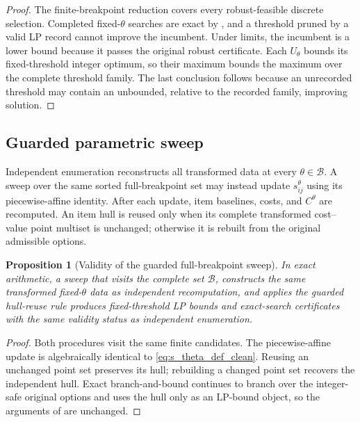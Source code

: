 \documentclass[11pt, a4paper]{article}
\theoremstyle{plain}
\newtheorem{proposition}[proposition]{Proposition}
\theoremstyle{definition}
\theoremstyle{remark}
\begin{document}
\begin{proof}
The finite-breakpoint reduction covers every robust-feasible discrete
selection.  Completed fixed-$\theta$ searches are exact by
, and a threshold pruned by a valid LP record cannot
improve the incumbent.  Under limits, the incumbent is a lower bound because
it passes the original robust certificate.  Each $U_\theta$ bounds its
fixed-threshold integer optimum, so their maximum bounds the maximum over the
complete threshold family.  The last conclusion follows because an unrecorded
threshold may contain an unbounded, relative to the recorded family, improving
solution.
\end{proof}

\subsection{Guarded parametric sweep}\label{subsec:sweep}

Independent enumeration reconstructs all transformed data at every
$\theta\in\mathcal B$.  A sweep over the same sorted full-breakpoint set may
instead update $s^\theta_{ij}$ using its piecewise-affine identity.  After each
update, item baselines, costs, and $C^\theta$ are recomputed.  An item hull is
reused only when its complete transformed cost--value point multiset is
unchanged; otherwise it is rebuilt from the original admissible options.

\begin{proposition}[Validity of the guarded full-breakpoint sweep]\label{prop:sweep_exact}
In exact arithmetic, a sweep that visits the complete set $\mathcal B$,
constructs the same transformed fixed-$\theta$ data as independent
recomputation, and applies the guarded hull-reuse rule produces fixed-threshold
LP bounds and exact-search certificates with the same validity status as
independent enumeration.
\end{proposition}

\begin{proof}
Both procedures visit the same finite candidates.  The piecewise-affine update
is algebraically identical to \eqref{eq:s_theta_def_clean}.  Reusing an
unchanged point set preserves its hull; rebuilding a changed point set recovers
the independent hull.  Exact branch-and-bound continues to branch over the
integer-safe original options and uses the hull only as an LP-bound object, so
the arguments of  are unchanged.
\end{proof}
\end{document}
